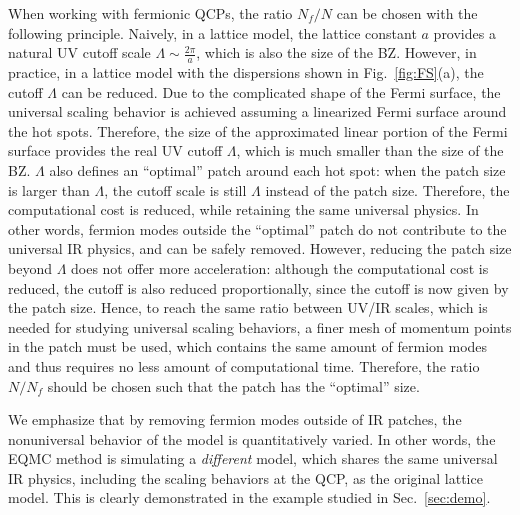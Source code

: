 \documentclass[aps,prx,twocolumn,superscriptaddress,showpacs,floatfix]{revtex4-1}
\begin{document}
When working with fermionic QCPs, the ratio $N_f/N$ can be chosen with the following principle. Naively, in a lattice model, the lattice constant $a$ provides a natural UV cutoff scale $\Lambda\sim\frac{2\pi}a$, which is also the size of the BZ.
However, in practice, in a lattice model with the dispersions shown in Fig.~\ref{fig:FS}(a), the cutoff $\Lambda$ can be reduced. Due to the complicated shape of the Fermi surface, the universal scaling behavior is achieved assuming a linearized Fermi surface around the hot spots.
Therefore, the size of the approximated linear portion of the Fermi surface provides the real UV cutoff $\Lambda$, which is much smaller than the size of the BZ.
$\Lambda$ also defines an ``optimal'' patch around each hot spot: when the patch size is larger than $\Lambda$, the cutoff scale is still $\Lambda$ instead of the patch size. Therefore, the computational cost is reduced, while retaining the same universal physics.
In other words, fermion modes outside the ``optimal'' patch do not contribute to the universal IR physics, and can be safely removed.
However, reducing the patch size beyond $\Lambda$ does not offer more acceleration: although the computational cost is reduced, the cutoff is also reduced proportionally, since the cutoff is now given by the patch size. Hence, to reach the same ratio between UV/IR scales, which is needed for studying universal scaling behaviors, a finer mesh of momentum points in the patch must be used, which contains the same amount of fermion modes and thus requires no less amount of computational time. Therefore, the ratio $N/N_f$ should be chosen such that the patch has the ``optimal'' size.

We emphasize that by removing fermion modes outside of IR patches, the nonuniversal behavior of the model is quantitatively varied.
In other words, the EQMC method is simulating a \emph{different} model, which shares the same universal IR physics, including the scaling behaviors at the QCP, as the original lattice model.
This is clearly demonstrated in the example studied in Sec.~\ref{sec:demo}.
\end{document}
